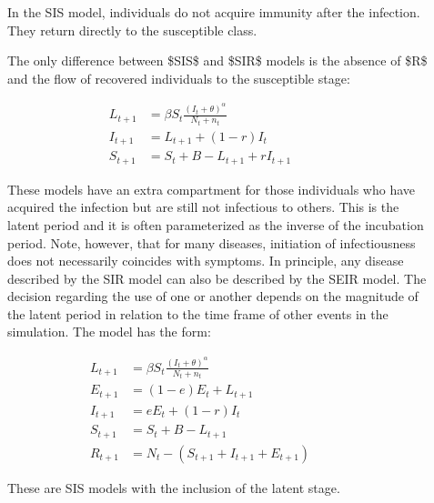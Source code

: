 \documentclass[letterpaper,10pt,english]{sphinxmanual}
\begin{document}
\ignorespaces \begin{description}
\item[{}] \leavevmode
In the SIS model, individuals do not acquire immunity after the infection. They return directly to the susceptible class.

The only difference between \$SIS\$ and \$SIR\$ models is the absence of \$R\$ and the flow of recovered individuals to the susceptible stage:

\end{description}
\label{equation:intromodels:E:SISmodel}\begin{align}
        L_{t+1} &= \beta S_t \frac{(I_t+\theta)^\alpha} {N_t+n_t} \nonumber\\
        I_{t+1} &= L_{t+1} + (1-r)I_t\nonumber\\
        S_{t+1} &= S_t + B - L_{t+1} + r I_{t+1}\nonumber
\end{align}
\ignorespaces \begin{description}
\item[{}] \leavevmode
These models have an extra compartment for those individuals who have acquired the infection but are still not infectious to others. This is the latent period and it is often parameterized as the inverse of the incubation period. Note, however, that for many diseases, initiation of infectiousness does not necessarily coincides with symptoms. In principle, any disease described by the SIR model can also be described by the SEIR model. The decision regarding the use of one or another depends on the magnitude of the latent period in relation to the time frame of other events in the simulation. The model has the form:

\end{description}
\label{equation:intromodels:E:SEIRmodel}\begin{align}
        L_{t+1} &= \beta S_t \frac{(I_t+\theta)^\alpha} {N_t+n_t}\nonumber \\
    E_{t+1} &= (1-e) E_t + L_{t+1}\nonumber\\
        I_{t+1} &= e E_t + (1-r)I_t\nonumber\\
        S_{t+1} &= S_t + B - L_{t+1}\nonumber\\
        R_{t+1} &= N_t-(S_{t+1}+I_{t+1}+E_{t+1})\nonumber
\end{align}
\ignorespaces \begin{description}
\item[{}] \leavevmode
These are SIS models with the inclusion of the latent stage.

\end{description}
\end{document}

